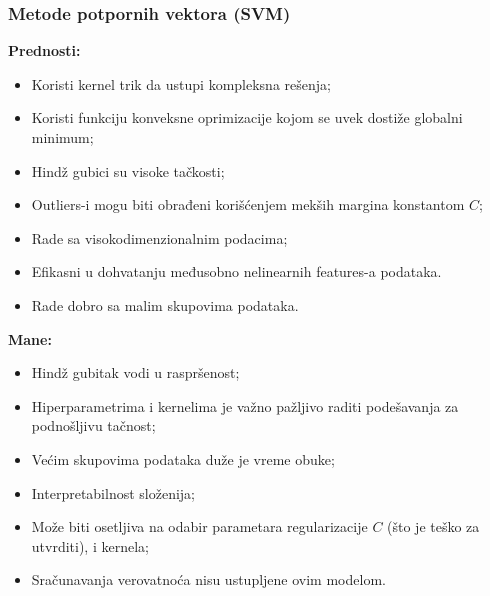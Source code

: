 \documentclass[fontsize=12bp, paper=a4]{scrarticle}
\begin{document}
\subsubsection{Metode potpornih vektora (SVM)}

\textbf{Prednosti:}
\begin{itemize}
    \item Koristi kernel trik da ustupi kompleksna rešenja;
    \item Koristi funkciju konveksne oprimizacije kojom se uvek dostiže globalni minimum;
    \item Hindž gubici su visoke tačkosti;
    \item Outliers-i mogu biti obrađeni korišćenjem mekših margina konstantom $C$;
    \item Rade sa visokodimenzionalnim podacima;
    \item Efikasni u dohvatanju međusobno nelinearnih features-a podataka.
    \item Rade dobro sa malim skupovima podataka.
\end{itemize}

\textbf{Mane:}
\begin{itemize}
    \item Hindž gubitak vodi u raspršenost;
    \item Hiperparametrima i kernelima je važno pažljivo raditi podešavanja za podnošljivu tačnost;
    \item Većim skupovima podataka duže je vreme obuke;
    \item Interpretabilnost složenija;
    \item Može biti osetljiva na odabir parametara regularizacije $C$ (što je teško za utvrditi), i kernela;
    \item Sračunavanja verovatnoća nisu ustupljene ovim modelom.
\end{itemize}




\end{document}
